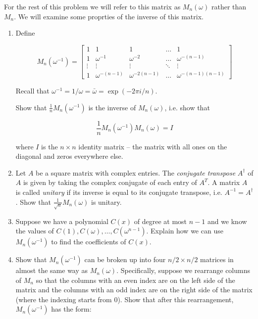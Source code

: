 \documentclass[11pt]{article}
\begin{document}
For the rest of this problem we will refer to this matrix as $M_n(\omega)$ rather than $M_n$. We will examine some proprties of the inverse of this matrix.

\begin{enumerate}[label=(\alph), resume]

\item Define

\[
M_n(\omega^{-1}) = 
\begin{bmatrix}
    1     & 1           & 1            & \dots  & 1 \\
    1     & \omega^{-1}      & \omega^{-2}     & \dots  & \omega^{-(n-1)} \\
    \vdots & \vdots & \vdots & \ddots & \vdots \\
    1     & \omega^{-(n-1)} & \omega^{-2(n-1)} & \dots  & \omega^{-(n-1)(n-1)}
\end{bmatrix}
\]

Recall that $\omega^{-1} = 1/\omega = \bar{\omega} = \exp(-2\pi i / n)$.

Show that $\frac{1}{n} M_n(\omega^{-1})$ is the inverse of $M_n(\omega)$, i.e. show that

\[
\frac{1}{n} M_n(\omega^{-1})M_n(\omega) = I
\]

where $I$ is the $n\times n$ identity matrix -- the matrix with all ones on the diagonal and zeros everywhere else.

\item Let $A$ be a square matrix with complex entries. The \emph{conjugate transpose} $A^{\dagger}$ of $A$ is given by taking the complex conjugate of each entry of $A^{T}$. A matrix $A$ is called \emph{unitary} if its inverse is equal to its conjugate transpose, i.e. $A^{-1} = A^{\dagger}$. Show that $\frac{1}{\sqrt{n}} M_{n}(\omega)$ is unitary.

\item Suppose we have a polynomial $C(x)$ of degree at most $n - 1$ and we know the values of $C(1), C(\omega), \ldots, C(\omega^{n-1})$. Explain how we can use $M_n(\omega^{-1})$ to find the coefficients of $C(x)$.

 \item
 Show that $M_n(\omega^{-1})$ can be broken up into four $n/2 \times n/2$ matrices in almost the same way as $M_n(\omega)$. Specifically, suppose we rearrange columns of $M_n$ so that the columns with an even index are on the left side of the matrix and the columns with an odd index are on the right side of the matrix (where the indexing starts from 0). Show that after this rearrangement, $M_n(\omega^{-1})$ has the form:


\end{enumerate}
\end{document}

